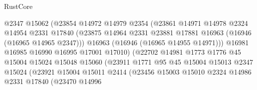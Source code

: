 \begin{lexlean}{RustCore}
\begin{coremodule}
                                  @2347
                                  @15062
                                  (@23854
                                    @14972
                                    @14979
                                    @2354
                                    (@23861
                                      @14971
                                      @14978
                                      @2324
                                      @14954
                                      @2331
                                      @17840
                                      (@23875
                                        @14964
                                        @2331
                                        @23881
                                        @17881
                                        @16963
                                        (@16946 (@16965 @14965 @2347)))
                                      @16963
                                      (@16946 (@16965 @14955 @14971)))
                                    @16981
                                    @16985
                                    @16990
                                    @16995
                                    @17001
                                    @17010)
                                  (@22702
                                    @14981
                                    @1773
                                    @1776
                                    @45
                                    @15004
                                    @15024
                                    @15048
                                    @15060
                                    (@23911
                                      @1771
                                      @95
                                      @45
                                      @15004
                                      @15013
                                      @2347
                                      @15024
                                      (@23921
                                        @15004
                                        @15011
                                        @2414
                                        (@23456
                                          @15003
                                          @15010
                                          @2324
                                          @14986
                                          @2331
                                          @17840
                                          (@23470
                                            @14996

\end{coremodule}
\end{lexlean}
